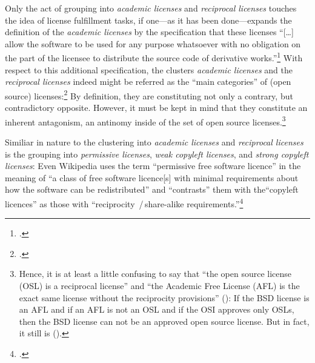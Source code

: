 Only the act of grouping into \emph{academic licenses} and 
\emph{reciprocal licenses} touches the idea of license fulfillment
tasks, if one---as it has been done---expands the definition of the  
\emph{academic licenses} by the specification that these licenses
\enquote{[\ldots] allow the software to be used for any purpose whatsoever with
no obligation on the part of the licensee to distribute the source code of
derivative works.}\footcite[cf.][71]{Rosen2005a} With respect to this additional
specification, the clusters \emph{academic licenses} and the
\emph{reciprocal licenses} indeed might be referred as the
\enquote{main categories} of (open source)
licenses:\footcite[cf.][179]{Rosen2005a} By definition, they are constituting
not only a contrary, but contradictory opposite. However, it must  be kept in
mind that they constitute an inherent antagonism, an antinomy inside of the set
of open source licenses.\footnote{Hence, it is at least a little confusing to say
that \enquote{the open source license (OSL) is a reciprocal license} and
\enquote{the Academic Free License (AFL) is the exact same license without the
reciprocity provisions} (\cite[cf.][180]{Rosen2005a}): If the BSD license is an
AFL and if an AFL is not an OSL and if the OSI approves only OSLs, then the BSD
license can not be an approved open source license. But in fact, it still is 
(\cite[cf.][\nopage wp]{OSI2012b}).}

Similiar in nature to the clustering into \emph{academic licenses} and 
\emph{reciprocal licenses} is the grouping into \emph{permissive licenses}, 
\emph{weak copyleft licenses}, and \emph{strong copyleft licenses}: 
Even Wikipedia uses the term \enquote{permissive free software licence} in the
meaning of \enquote{a class of free software licence[s] with minimal
requirements about how the software can be redistributed} and \enquote{contrasts}
them with the\enquote{copyleft licences} as those with \enquote{reciprocity%
\,/\,share-alike requirements.}\footcite[cf.][\nopage wp]{wpPermLic2013a}

